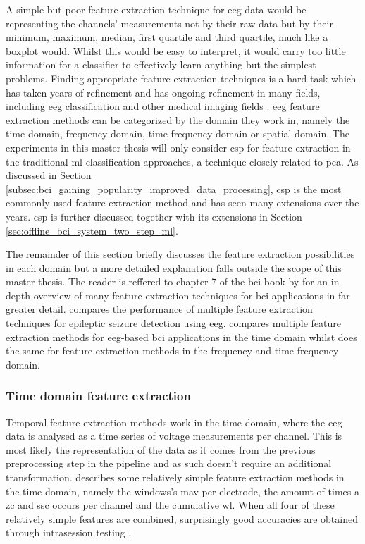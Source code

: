 A simple but poor feature extraction technique for \gls{eeg} data would be representing the channels' measurements not by their raw data but by their minimum, maximum, median, first quartile and third quartile, much like a boxplot would.
Whilst this would be easy to interpret, it would carry too little information for a classifier to effectively learn anything but the simplest problems.
Finding appropriate feature extraction techniques is a hard task which has taken years of refinement and has ongoing refinement in many fields, including \gls{eeg} classification and other medical imaging fields \citep{CAD_ml_dl_kbs}.
\gls{eeg} feature extraction methods can be categorized by the domain they work in, namely the time domain, frequency domain, time-frequency domain or spatial domain.
The experiments in this master thesis will only consider \gls{csp} for feature extraction in the traditional \gls{ml} classification approaches, a technique closely related to \gls{pca}.
As discussed in Section \ref{subsec:bci_gaining_popularity_improved_data_processing}, \gls{csp} is the most commonly used feature extraction method and has seen many extensions over the years.
\gls{csp} is further discussed together with its extensions in Section \ref{sec:offline_bci_system_two_step_ml}.

The remainder of this section briefly discusses the feature extraction possibilities in each domain but a more detailed explanation falls outside the scope of this master thesis.
The reader is reffered to chapter 7 of the \gls{bci} book by \citet{bci_book} for an in-depth overview of many feature extraction techniques for \gls{bci} applications in far greater detail.
 compares the performance of multiple feature extraction techniques for epileptic seizure detection using \gls{eeg}.
 compares multiple feature extraction methods for \gls{eeg}-based \gls{bci} applications in the time domain whilst \citet{timefreq_domain_eeg_features} does the same for feature extraction methods in the frequency and time-frequency domain.



\subsubsection{Time domain feature extraction}
\label{subsubsec:processing_signals_general_pipeline_features_timedomain}

Temporal feature extraction methods work in the time domain, where the \gls{eeg} data is analysed as a time series of voltage measurements per channel.
This is most likely the representation of the data as it comes from the previous preprocessing step in the pipeline and as such doesn't require an additional transformation.
 describes some relatively simple feature extraction methods in the time domain, namely the windows's \gls{mav} per electrode, the amount of times a \gls{zc} and \gls{ssc} occurs per channel and the cumulative \gls{wl}.
When all four of these relatively simple features are combined, surprisingly good accuracies are obtained through intrasession testing \citep{time_domain_eeg_features}.

